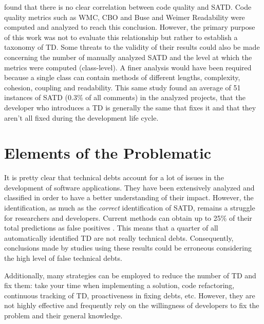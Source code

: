 \citet{BavotaR16} found that there is no clear correlation between code quality and \ac{SATD}. Code quality metrics such as \ac{WMC}, \ac{CBO} and Buse and Weimer Readability \citep{Buse:tse2010} were computed and analyzed to reach this conclusion. However, the primary purpose of this work was not to evaluate this relationship but rather to establish a taxonomy of \ac{TD}. Some threats to the validity of their results could also be made concerning the number of manually analyzed \ac{SATD} and the level at which the metrics were computed (class-level). A finer analysis would have been required because a single class can contain methods of different lengths, complexity, cohesion, coupling and readability. This same study found an average of 51 instances of \ac{SATD} (0.3\% of all comments) in the analyzed projects, that the developer who introduces a \ac{TD} is generally the same that fixes it and that they aren't all fixed during the development life cycle. \par


\section{Elements of the Problematic}  


It is pretty clear that technical debts account for a lot of issues in the development of software applications. They have been extensively analyzed and classified in order to have a better understanding of their impact. However, the identification, as much as the \emph{correct} identification of \ac{SATD}, remains a struggle for researchers and developers. Current methods can obtain up to 25\% of their total predictions as false positives \citep{BavotaR16}. This means that a quarter of all automatically identified \ac{TD} are not really technical debts. Consequently, conclusions made by studies using these results could be erroneous considering the high level of false technical debts. 

Additionally, many strategies can be employed to reduce the number of TD and fix them: take your time when implementing a solution, code refactoring, continuous tracking of \ac{TD}, proactiveness in fixing debts, etc. \citep{Ambler} However, they are not highly effective and frequently rely on the willingness of developers to fix the problem and their general knowledge. \par


